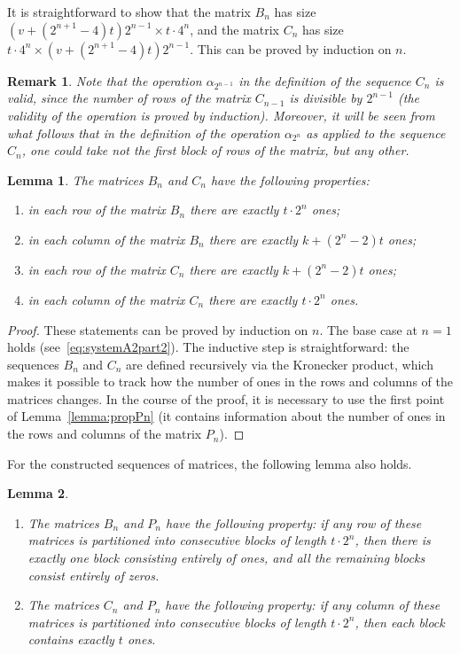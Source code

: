 \documentclass{article}
\newtheorem{lemma}{Lemma}
\newtheorem*{remark}{Remark}
\begin{document}
It is straightforward to show that the matrix $B_n$ has size $(v+(2^{n+1}-4)t)2^{n-1} \times t\cdot 4^n$, and the matrix $C_n$ has size $t\cdot 4^n \times (v+(2^{n+1}-4)t)2^{n-1}$. This can be proved by induction on $n$.

\begin{remark}
Note that the operation $\alpha_{2^{n-1}}$ in the definition of the sequence $C_n$ is valid, since the number of rows of the matrix $C_{n-1}$ is divisible by $2^{n-1}$ (the validity of the operation is proved by induction). Moreover, it will be seen from what follows that in the definition of the operation $\alpha_{2^n}$ as applied to the sequence $C_n$, one could take not the first block of rows of the matrix, but any other.
\end{remark}

\begin{lemma}
\label{lemma:summBnCn}
The matrices $B_n$ and $C_n$ have the following properties:
\begin{enumerate}
	\item in each row of the matrix $B_n$ there are exactly $t\cdot 2^n$ ones;
	\item in each column of the matrix $B_n$ there are exactly $k + (2^n - 2)t$ ones;
	\item in each row of the matrix $C_n$ there are exactly $k + (2^n - 2)t$ ones;
	\item in each column of the matrix $C_n$ there are exactly $t\cdot 2^n$ ones.			
\end{enumerate}
\end{lemma}

\begin{proof}
These statements can be proved by induction on $n$. The base case at $n=1$ holds (see~\eqref{eq:systemA2part2}). The inductive step is straightforward: the sequences $B_n$ and $C_n$ are defined recursively via the Kronecker product, which makes it possible to track how the number of ones in the rows and columns of the matrices changes. In the course of the proof, it is necessary to use the first point of Lemma~\ref{lemma:propPn} (it contains information about the number of ones in the rows and columns of the matrix $P_n$).
\end{proof}

For the constructed sequences of matrices, the following lemma also holds.
\begin{lemma}$~$
\label{lemma:propsBnCnPn}
\begin{enumerate}
\item The matrices $B_n$ and $P_n$ have the following property: if any row of these matrices is partitioned into consecutive blocks of length $t\cdot 2^n$, then there is exactly one block consisting entirely of ones, and all the remaining blocks consist entirely of zeros.
\item The matrices $C_n$ and $P_n$ have the following property: if any column of these matrices is partitioned into consecutive blocks of length $t\cdot 2^n$, then each block contains exactly $t$ ones.
\end{enumerate}
\end{lemma}
\end{document}
